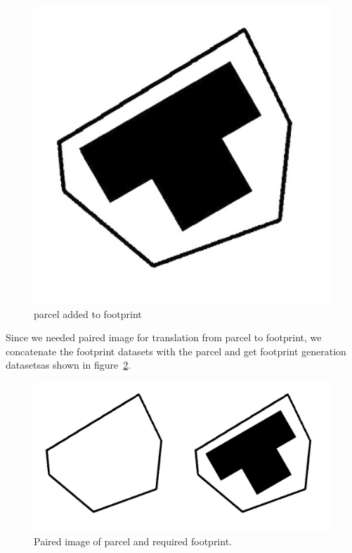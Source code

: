 \begin{figure}[h]
\begin{minipage}{.45\textwidth}
                    \includegraphics[width=.8\linewidth,frame]{img/experiment/dataset/11footprint_plus_parcel.jpg}
                    \caption{parcel added to footprint}
                    \label{fig:dataset-footprint-plus-parcel}
                \end{minipage}
            \end{figure}    
            \break 
            Since we needed paired image for translation from parcel to footprint, we concatenate the footprint datasets with the parcel and get footprint generation datasetsas shown in figure~\ref{fig:dataset-final-paired}.
            \begin{figure}[h]
                \centering
                    \includegraphics[width=.8\linewidth,frame]{img/experiment/dataset/12footprint_generation_dataset.jpg}
                    \caption{Paired image of parcel and required footprint.}
                    \label{fig:dataset-final-paired}
                
            \end{figure}    
